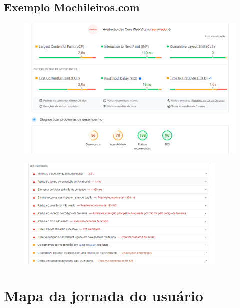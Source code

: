 \documentclass{article}
\begin{document}
\subsection{Exemplo Mochileiros.com}

\begin{figure}[h]
      \centering
      \includegraphics [width=1\textwidth]{IMGDOC/AnaliseMochileiros1.png}
      \label{fig:imagem}
\end{figure}
\begin{figure}[h]
      \centering
      \includegraphics [width=0.9\textwidth]{IMGDOC/AnaliseMochileiros2.png}
      \label{fig:imagem}
\end{figure}

\section{Mapa da jornada do usuário}
\end{document}
